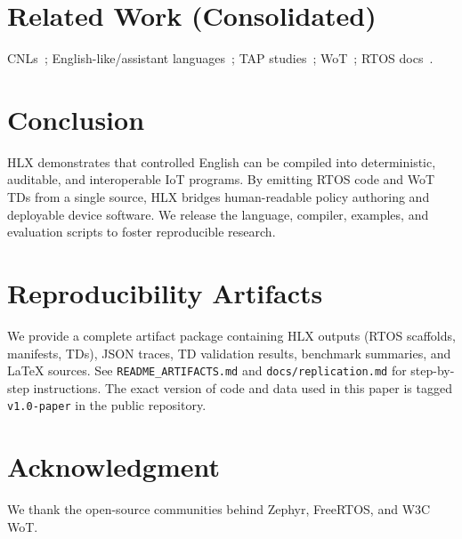 \documentclass[journal]{IEEEtran}
\begin{document}
\section{Related Work (Consolidated)}
CNLs~\cite{KuhnCNL14,ACEManual}; English-like/assistant languages~\cite{InformSite,AppleScriptGuide,ThingTalk22,GeniePLDI19}; TAP studies~\cite{UrIFTTT16,BrackenburyTAP19}; WoT~\cite{WoT11}; RTOS docs~\cite{ZephyrDocs,FreeRTOSDocs}.

\section{Conclusion}
HLX demonstrates that controlled English can be compiled into deterministic, auditable, and interoperable IoT programs. By emitting RTOS code and WoT TDs from a single source, HLX bridges human-readable policy authoring and deployable device software. We release the language, compiler, examples, and evaluation scripts to foster reproducible research.

\section*{Reproducibility Artifacts}
We provide a complete artifact package containing HLX outputs (RTOS scaffolds, manifests, TDs), JSON traces, TD validation results, benchmark summaries, and LaTeX sources. See \texttt{README\_ARTIFACTS.md} and \texttt{docs/replication.md} for step-by-step instructions. The exact version of code and data used in this paper is tagged \texttt{v1.0-paper} in the public repository.

\section*{Acknowledgment}
We thank the open-source communities behind Zephyr, FreeRTOS, and W3C WoT.



\end{document}

